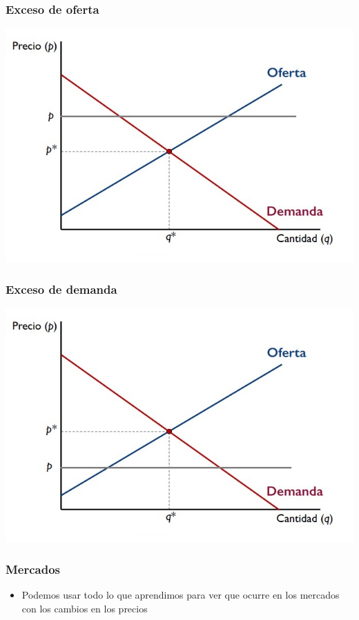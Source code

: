 \documentclass{beamer}
\begin{document}
\begin{frame}
\frametitle{Exceso de oferta}
\includegraphics[scale=0.6]{../Figures/Tema_07.3_equilibrioofertademanda_0excesodeoferta.jpg}
\end{frame}

\begin{frame}
\frametitle{Exceso de demanda}
\includegraphics[scale=0.6]{../Figures/Tema_07.3_equilibrioofertademanda_0excesodedemanda.jpg}
\end{frame}

\begin{frame}
\frametitle{Mercados}
\begin{itemize}
    \item Podemos usar todo lo que aprendimos para ver que ocurre en los mercados con los cambios en los precios
\end{itemize}
\end{frame}
\end{document}
